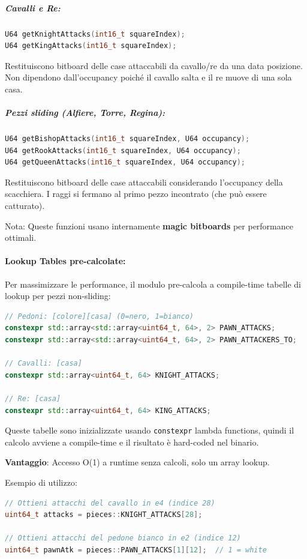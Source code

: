 \subparagraph{Cavalli e Re:}
\begin{lstlisting}[language=C++]
U64 getKnightAttacks(int16_t squareIndex);
U64 getKingAttacks(int16_t squareIndex);
\end{lstlisting}

Restituiscono bitboard delle case attaccabili da cavallo/re da una data posizione.
Non dipendono dall'occupancy poiché il cavallo salta e il re muove di una sola casa.

\subparagraph{Pezzi sliding (Alfiere, Torre, Regina):}
\begin{lstlisting}[language=C++]
U64 getBishopAttacks(int16_t squareIndex, U64 occupancy);
U64 getRookAttacks(int16_t squareIndex, U64 occupancy);
U64 getQueenAttacks(int16_t squareIndex, U64 occupancy);
\end{lstlisting}

Restituiscono bitboard delle case attaccabili considerando l'occupancy della scacchiera.
I raggi si fermano al primo pezzo incontrato (che può essere catturato).

Nota: Queste funzioni usano internamente \textbf{magic bitboards} per performance ottimali.

\paragraph{Lookup Tables pre-calcolate:}

Per massimizzare le performance, il modulo pre-calcola a compile-time tabelle di lookup
per pezzi non-sliding:

\begin{lstlisting}[language=C++]
// Pedoni: [colore][casa] (0=nero, 1=bianco)
constexpr std::array<std::array<uint64_t, 64>, 2> PAWN_ATTACKS;
constexpr std::array<std::array<uint64_t, 64>, 2> PAWN_ATTACKERS_TO;

// Cavalli: [casa]
constexpr std::array<uint64_t, 64> KNIGHT_ATTACKS;

// Re: [casa]
constexpr std::array<uint64_t, 64> KING_ATTACKS;
\end{lstlisting}

Queste tabelle sono inizializzate usando \texttt{constexpr} lambda functions,
quindi il calcolo avviene a compile-time e il risultato è hard-coded nel binario.

\textbf{Vantaggio}: Accesso O(1) a runtime senza calcoli, solo un array lookup.

Esempio di utilizzo:
\begin{lstlisting}[language=C++]
// Ottieni attacchi del cavallo in e4 (indice 28)
uint64_t attacks = pieces::KNIGHT_ATTACKS[28];

// Ottieni attacchi del pedone bianco in e2 (indice 12)
uint64_t pawnAtk = pieces::PAWN_ATTACKS[1][12];  // 1 = white
\end{lstlisting}

